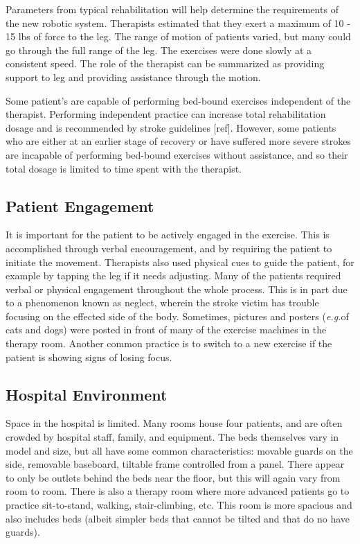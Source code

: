 \documentclass[12pt]{report}
\begin{document}
	Parameters from typical rehabilitation will help determine the requirements of the new robotic system. Therapists estimated that they exert a maximum of 10 - 15 lbs of force to the leg. The range of motion of patients varied, but many could go through the full range of the leg. The exercises were done slowly at a consistent speed. The role of the therapist can be summarized as providing support to leg and providing assistance through the motion. 
	
	Some patient's are capable of performing bed-bound exercises independent of the therapist. Performing independent practice can increase total rehabilitation dosage and is recommended by stroke guidelines [ref]. However, some patients who are either at an earlier stage of recovery or have suffered more severe strokes are incapable of performing bed-bound exercises without assistance, and so their total dosage is limited to time spent with the therapist. 
	
	\subsection{Patient Engagement} 
	 It is important for the patient to be actively engaged in the exercise. This is accomplished through verbal encouragement, and by requiring the patient to initiate the movement. Therapists also used physical cues to guide the patient, for example by tapping the leg if it needs adjusting. Many of the patients required verbal or physical engagement throughout the whole process. This is in part due to a phenomenon known as neglect, wherein the stroke victim has trouble focusing on the effected side of the body. Sometimes, pictures and posters (\textit{e.g.}of cats and dogs) were posted in front of many of the exercise machines in the therapy room. Another common practice is to switch to a new exercise if the patient is showing signs of losing focus. 
	 
	 \subsection{Hospital Environment}
	Space in the hospital is limited. Many rooms house four patients, and are often crowded by hospital staff, family, and equipment. The beds themselves vary in model and size, but all have some common characteristics: movable guards on the side, removable baseboard, tiltable frame controlled from a panel. There appear to only be outlets behind the beds near the floor, but this will again vary from room to room. 
	There is also a therapy room where more advanced patients go to practice sit-to-stand, walking, stair-climbing, etc. This room is more spacious and also includes beds (albeit simpler beds that cannot be tilted and that do no have guards). 
	
\end{document}
